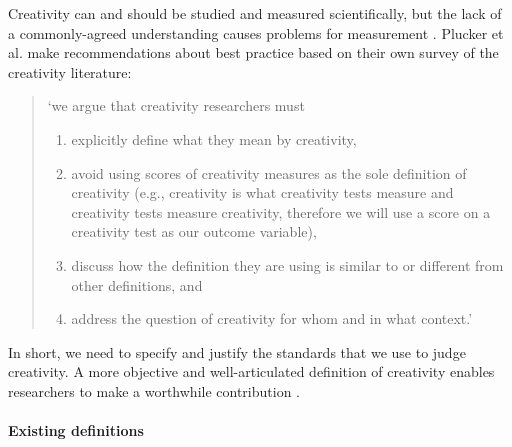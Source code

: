 \documentclass[10pt,letterpaper]{article}
\begin{document}
Creativity can and should be studied and measured scientifically, but the lack of a commonly-agreed understanding causes problems for measurement \cite{kaufman09}. Plucker et al. make recommendations about best practice based on their own survey of the creativity literature:
\begin{quote}
\noindent
`we argue that creativity researchers must

\begin{enumerate}
\renewcommand{\labelenumi}{(\alph{enumi})}
\item explicitly define what they mean by creativity,
\item avoid using scores of creativity measures as the sole definition of creativity (e.g., creativity is what creativity tests measure and creativity tests measure creativity, therefore we will use a score on a creativity test as our outcome variable),
\item discuss how the definition they are using is similar to or different from other definitions, and
\item address the question of creativity for whom and in what context.' \cite[p.92]{plucker04defn}
\end{enumerate}
\end{quote}

\noindent In short, we need to specify and justify the standards that we use to judge creativity. A more objective and well-articulated definition of creativity enables researchers to make a worthwhile contribution \cite{torrance67,plucker04defn,kaufman09}. 

\paragraph{Existing definitions}
\label{existing_defs}
\end{document}
